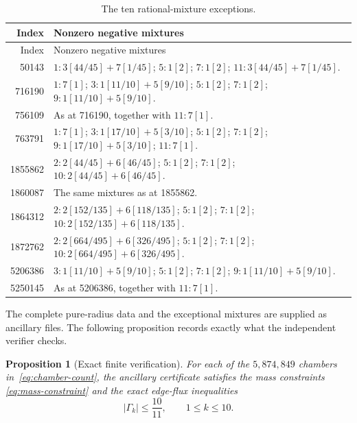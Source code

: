 \documentclass[11pt]{amsart}
\newtheorem{proposition}[theorem]{Proposition}
\theoremstyle{definition}
\begin{document}
\begin{longtable}{@{}r>{\raggedright\arraybackslash}p{}@{}}
\caption{The ten rational-mixture exceptions.}\label{tab:exceptions}\\
\toprule
Index & Nonzero negative mixtures \\
\midrule
\endfirsthead
\toprule
Index & Nonzero negative mixtures \\
\midrule
\endhead
50143 & $1:3[44/45]+7[1/45]$; $5:1[2]$; $7:1[2]$; $11:3[44/45]+7[1/45]$.\\
716190 & $1:7[1]$; $3:1[11/10]+5[9/10]$; $5:1[2]$; $7:1[2]$; $9:1[11/10]+5[9/10]$.\\
756109 & As at 716190, together with $11:7[1]$.\\
763791 & $1:7[1]$; $3:1[17/10]+5[3/10]$; $5:1[2]$; $7:1[2]$; $9:1[17/10]+5[3/10]$; $11:7[1]$.\\
1855862 & $2:2[44/45]+6[46/45]$; $5:1[2]$; $7:1[2]$; $10:2[44/45]+6[46/45]$.\\
1860087 & The same mixtures as at 1855862.\\
1864312 & $2:2[152/135]+6[118/135]$; $5:1[2]$; $7:1[2]$; $10:2[152/135]+6[118/135]$.\\
1872762 & $2:2[664/495]+6[326/495]$; $5:1[2]$; $7:1[2]$; $10:2[664/495]+6[326/495]$.\\
5206386 & $3:1[11/10]+5[9/10]$; $5:1[2]$; $7:1[2]$; $9:1[11/10]+5[9/10]$.\\
5250145 & As at 5206386, together with $11:7[1]$.\\
\bottomrule
\end{longtable}

The complete pure-radius data and the exceptional mixtures are supplied as
ancillary files.  The following proposition records exactly what the
independent verifier checks.

\begin{proposition}[Exact finite verification]\label{prop:verification}
For each of the $5{,}874{,}849$ chambers in~\eqref{eq:chamber-count}, the
ancillary certificate satisfies the mass constraints
\eqref{eq:mass-constraint} and the exact edge-flux inequalities
\[
  |\Gamma_k|\leq\frac{10}{11},\qquad 1\leq k\leq10.
\]
\end{proposition}
\end{document}
